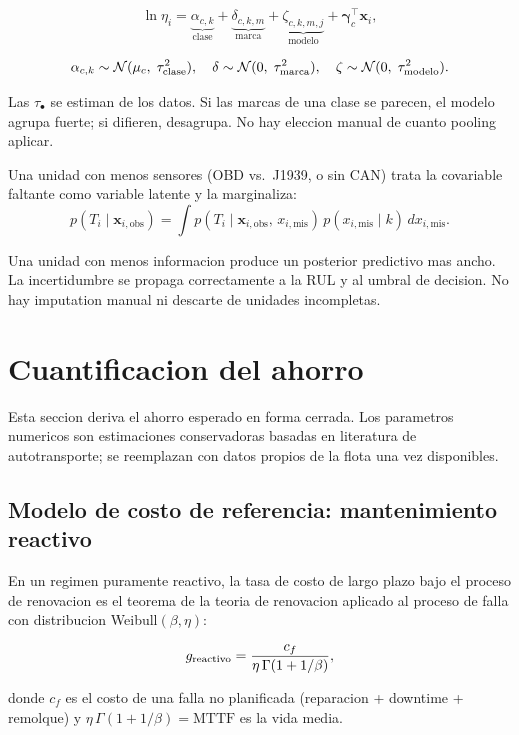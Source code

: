 \documentclass[11pt,a4paper]{article}
\begin{document}
$$\ln\eta_i
  = \underbrace{\alpha_{c,k}}_{\text{clase}}
  + \underbrace{\delta_{c,k,m}}_{\text{marca}}
  + \underbrace{\zeta_{c,k,m,j}}_{\text{modelo}}
  + \boldsymbol{\gamma}_c^\top\mathbf{x}_i,$$

$$\alpha_{c,k} \sim \mathcal{N}(\mu_c,\;\tau_{\rm clase}^2), \quad
  \delta \sim \mathcal{N}(0,\;\tau_{\rm marca}^2), \quad
  \zeta \sim \mathcal{N}(0,\;\tau_{\rm modelo}^2).$$

Las $\tau_\bullet$ se estiman de los datos. Si las marcas de una clase se
parecen, el modelo agrupa fuerte; si difieren, desagrupa. No hay eleccion
manual de cuanto pooling aplicar.

Una unidad con menos sensores (OBD vs.\ J1939, o sin CAN) trata la
covariable faltante como variable latente y la marginaliza:
$$p(T_i \mid \mathbf{x}_{i,\mathrm{obs}})
  = \int p(T_i \mid \mathbf{x}_{i,\mathrm{obs}},\,x_{i,\mathrm{mis}})
  \,p(x_{i,\mathrm{mis}} \mid k)\,dx_{i,\mathrm{mis}}.$$

Una unidad con menos informacion produce un posterior predictivo mas ancho.
La incertidumbre se propaga correctamente a la RUL y al umbral de decision.
No hay imputation manual ni descarte de unidades incompletas.

\section{Cuantificacion del ahorro}

Esta seccion deriva el ahorro esperado en forma cerrada. Los parametros
numericos son estimaciones conservadoras basadas en literatura de
autotransporte; se reemplazan con datos propios de la flota una vez
disponibles.

\subsection{Modelo de costo de referencia: mantenimiento reactivo}

En un regimen puramente reactivo, la tasa de costo de largo plazo
bajo el proceso de renovacion es el teorema de la teoria de renovacion
aplicado al proceso de falla con distribucion Weibull$(\beta, \eta)$:

$$g_{\rm reactivo} = \frac{c_f}{\eta\,\Gamma(1 + 1/\beta)},$$

donde $c_f$ es el costo de una falla no planificada (reparacion + downtime
+ remolque) y $\eta\,\Gamma(1+1/\beta) = \mathrm{MTTF}$ es la vida media.
\end{document}
